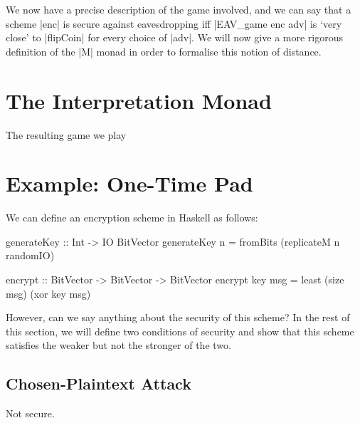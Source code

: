 We now have a precise description of the game involved, and we can say that a scheme |enc| is secure against
eavesdropping iff |EAV_game enc adv| is `very close' to |flipCoin| for every choice of |adv|.  We will now give a more
rigorous definition of the |M| monad in order to formalise this notion of distance.

\section{The Interpretation Monad}

The resulting game we play 


\section{Example: One-Time Pad}

We can define an encryption scheme in Haskell as follows:
\begin{code}
    generateKey :: Int -> IO BitVector
    generateKey n = fromBits (replicateM n randomIO)

    encrypt :: BitVector -> BitVector -> BitVector
    encrypt key msg = least (size msg) (xor key msg)
\end{code}

However, can we say anything about the security of this scheme?  In the rest of this section, we will define two
conditions of security and show that this scheme satisfies the weaker but not the stronger of the two.

\subsection{}

\subsection{Chosen-Plaintext Attack}

Not secure.


